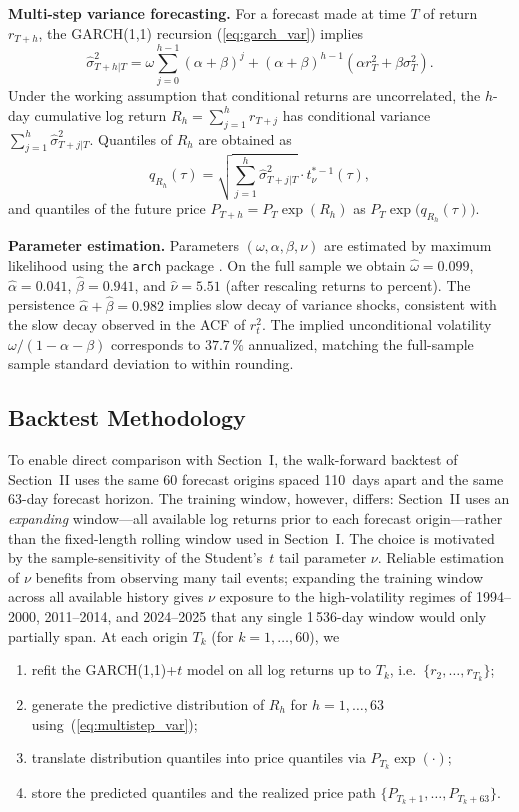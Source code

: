 \documentclass[journal]{IEEEtran}
\begin{document}
\textbf{Multi-step variance forecasting.}  For a forecast made at time $T$
of return $r_{T+h}$, the GARCH(1,1) recursion (\ref{eq:garch_var}) implies
\begin{equation}
\label{eq:multistep_var}
\hat\sigma^2_{T+h|T} = \omega \sum_{j=0}^{h-1}(\alpha+\beta)^j
   + (\alpha+\beta)^{h-1}\!\left(\alpha r_T^2 + \beta \sigma_T^2\right).
\end{equation}
Under the working assumption that conditional returns are uncorrelated, the
$h$-day cumulative log return $R_h = \sum_{j=1}^h r_{T+j}$ has conditional
variance $\sum_{j=1}^h \hat\sigma^2_{T+j|T}$.  Quantiles of $R_h$ are
obtained as
$$q_{R_h}(\tau) = \sqrt{\textstyle\sum_{j=1}^h \hat\sigma^2_{T+j|T}} \cdot t^{*-1}_\nu(\tau),$$
and quantiles of the future price $P_{T+h} = P_T \exp(R_h)$ as
$P_T \exp\!\big(q_{R_h}(\tau)\big)$.

\textbf{Parameter estimation.}  Parameters $(\omega,\alpha,\beta,\nu)$
are estimated by maximum likelihood using the \texttt{arch} package
\cite{archpkg}.  On the full sample we obtain $\hat\omega = 0.099$,
$\hat\alpha = 0.041$, $\hat\beta = 0.941$, and $\hat\nu = 5.51$ (after
rescaling returns to percent).  The persistence $\hat\alpha + \hat\beta =
0.982$ implies slow decay of variance shocks, consistent with the slow
decay observed in the ACF of $r_t^2$.  The implied unconditional
volatility $\omega / (1 - \alpha - \beta)$ corresponds to $37.7\,\%$
annualized, matching the full-sample sample standard deviation
to within rounding.

\subsection{Backtest Methodology}
\label{sec:methods}

To enable direct comparison with Section~I, the walk-forward backtest of
Section~II uses the same 60 forecast origins spaced 110~days apart and
the same 63-day forecast horizon.  The training window, however, differs:
Section~II uses an \emph{expanding} window---all available log returns
prior to each forecast origin---rather than the fixed-length rolling
window used in Section~I.  The choice is motivated by the
sample-sensitivity of the Student's~$t$ tail parameter $\nu$.  Reliable
estimation of $\nu$ benefits from observing many tail events; expanding
the training window across all available history gives $\nu$ exposure
to the high-volatility regimes of 1994--2000, 2011--2014, and 2024--2025
that any single 1\,536-day window would only partially span.  At each
origin $T_k$ (for $k=1,\dots,60$), we
\begin{enumerate}
\item refit the GARCH(1,1)+$t$ model on all log returns up to $T_k$,
      i.e.\ $\{r_2, \dots, r_{T_k}\}$;
\item generate the predictive distribution of $R_h$ for $h = 1,\dots,63$
      using~(\ref{eq:multistep_var});
\item translate distribution quantiles into price quantiles via
      $P_{T_k}\exp(\cdot)$;
\item store the predicted quantiles and the realized price path
      $\{P_{T_k+1},\dots,P_{T_k+63}\}$.
\end{enumerate}
\end{document}
